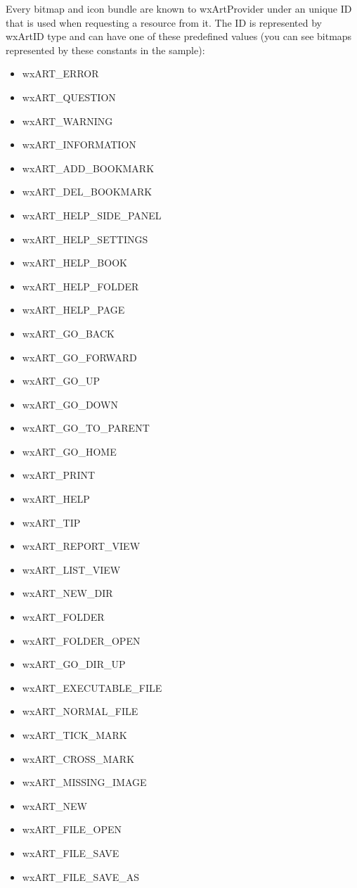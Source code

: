 Every bitmap and icon bundle are known to wxArtProvider under an unique ID that is used when
requesting a resource from it. The ID is represented by wxArtID type and can
have one of these predefined values (you can see bitmaps represented by these
constants in the  sample):
\begin{itemize}\itemsep=0pt

\item wxART\_ERROR
\item wxART\_QUESTION
\item wxART\_WARNING
\item wxART\_INFORMATION
\item wxART\_ADD\_BOOKMARK
\item wxART\_DEL\_BOOKMARK
\item wxART\_HELP\_SIDE\_PANEL
\item wxART\_HELP\_SETTINGS
\item wxART\_HELP\_BOOK
\item wxART\_HELP\_FOLDER
\item wxART\_HELP\_PAGE
\item wxART\_GO\_BACK
\item wxART\_GO\_FORWARD
\item wxART\_GO\_UP
\item wxART\_GO\_DOWN
\item wxART\_GO\_TO\_PARENT
\item wxART\_GO\_HOME
\item wxART\_PRINT
\item wxART\_HELP
\item wxART\_TIP
\item wxART\_REPORT\_VIEW
\item wxART\_LIST\_VIEW
\item wxART\_NEW\_DIR
\item wxART\_FOLDER
\item wxART\_FOLDER\_OPEN
\item wxART\_GO\_DIR\_UP
\item wxART\_EXECUTABLE\_FILE
\item wxART\_NORMAL\_FILE
\item wxART\_TICK\_MARK
\item wxART\_CROSS\_MARK
\item wxART\_MISSING\_IMAGE
\item wxART\_NEW
\item wxART\_FILE\_OPEN
\item wxART\_FILE\_SAVE
\item wxART\_FILE\_SAVE\_AS

\end{itemize}
